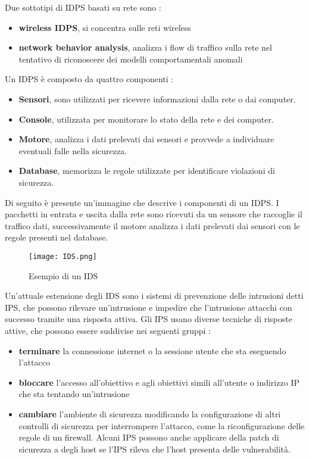 \documentclass[../main.tex]{subfiles}
\begin{document}
Due sottotipi di IDPS basati su rete sono \cite{IPS}:
\begin{itemize}
				\item \textbf{wireless IDPS}, si concentra sulle reti wireless
				\item \textbf{network behavior analysis}, analizza i flow di traffico sulla rete nel tentativo di riconoscere dei modelli comportamentali anomali
\end{itemize}

Un IDPS è composto da quattro componenti \cite{idsbook}:

\begin{itemize}
				\item \textbf{Sensori}, sono utilizzati per ricevere informazioni dalla rete o dai computer.

				\item \textbf{Console}, utilizzata per monitorare lo stato della rete e dei computer.

				\item \textbf{Motore}, analizza i dati prelevati dai sensori e provvede a individuare eventuali falle nella sicurezza.

				\item \textbf{Database}, memorizza le regole utilizzate per identificare violazioni di sicurezza.
\end{itemize}

Di seguito è presente un'immagine che descrive i componenti di un IDPS. I pacchetti in entrata e uscita dalla rete sono ricevuti da un sensore che raccoglie il traffico dati, successivamente il motore analizza i dati prelevati dai sensori con le regole presenti nel database.

\begin{figure}[H]
				\centering
				\texttt{[image: IDS.png]}
				\caption{Esempio di un IDS}
\end{figure}

Un'attuale estensione degli IDS sono i sistemi di prevenzione delle intrusioni detti IPS, che possono rilevare un'intrusione e impedire che l'intrusione attacchi con successo tramite una risposta attiva. Gli IPS usano diverse tecniche di risposte attive, che possono essere suddivise nei seguenti gruppi \cite{IPS}:

\begin{itemize}
				\item \textbf{terminare} la connessione internet o la sessione utente che sta eseguendo l'attacco
				\item \textbf{bloccare} l'accesso all'obiettivo e agli obiettivi simili all'utente o indirizzo IP che sta tentando un'intrusione
				\item \textbf{cambiare} l'ambiente di sicurezza modificando la configurazione di altri controlli di sicurezza per interrompere l'attacco, come la riconfigurazione delle regole di un firewall. Alcuni IPS possono anche applicare della patch di sicurezza a degli host se l'IPS rileva che l'host presenta delle vulnerabilità.
\end{itemize}
\end{document}
